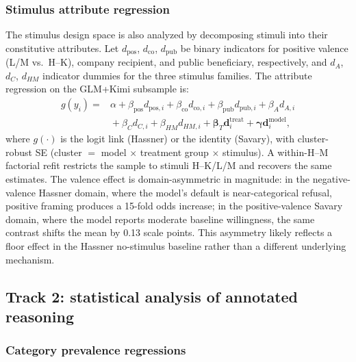 \documentclass[14pt,a4paper]{extarticle}
\begin{document}
\subsubsection*{Stimulus attribute regression}

The stimulus design space is also analyzed by decomposing stimuli into their constitutive attributes. Let $d_{\mathrm{pos}}$, $d_{\mathrm{co}}$, $d_{\mathrm{pub}}$ be binary indicators for positive valence (L/M vs.\ H--K), company recipient, and public beneficiary, respectively, and $d_A$, $d_C$, $d_{HM}$ indicator dummies for the three stimulus families. The attribute regression on the GLM+Kimi subsample is:
\begin{equation}
\begin{aligned}
g(y_i) ={}& \alpha + \beta_{\mathrm{pos}} d_{\mathrm{pos},i} + \beta_{\mathrm{co}} d_{\mathrm{co},i} + \beta_{\mathrm{pub}} d_{\mathrm{pub},i} + \beta_A d_{A,i} \\
&{} + \beta_C d_{C,i} + \beta_{HM} d_{HM,i} + \boldsymbol{\beta}_T \mathbf{d}^{\mathrm{treat}}_i + \boldsymbol{\gamma} \mathbf{d}^{\mathrm{model}}_i,
\end{aligned}
\label{eq:attr}
\end{equation}
where $g(\cdot)$ is the logit link (Hassner) or the identity (Savary), with cluster-robust SE (cluster $=$ model $\times$ treatment group $\times$ stimulus). A within-H--M factorial refit restricts the sample to stimuli H--K/L/M and recovers the same estimates. The valence effect is domain-asymmetric in magnitude: in the negative-valence Hassner domain, where the model's default is near-categorical refusal, positive framing produces a 15-fold odds increase; in the positive-valence Savary domain, where the model reports moderate baseline willingness, the same contrast shifts the mean by 0.13 scale points. This asymmetry likely reflects a floor effect in the Hassner no-stimulus baseline rather than a different underlying mechanism.

\subsection{Track 2: statistical analysis of annotated reasoning}

\subsubsection*{Category prevalence regressions}
\end{document}

